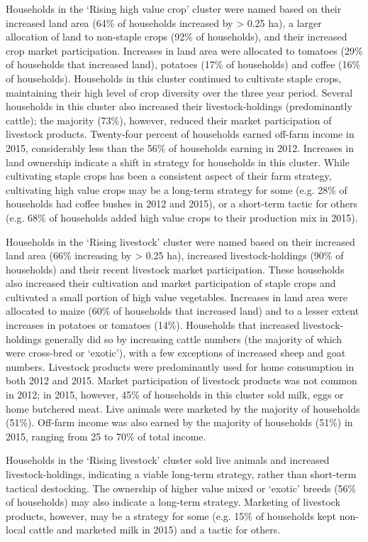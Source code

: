 Households in the `Rising high value crop' cluster were named based on their increased land area (64\% of households increased by {\textgreater} 0.25 ha), a larger allocation of land to non-staple crops (92\% of households), and their increased crop market participation. Increases in land area were allocated to tomatoes (29\% of households that increased land), potatoes (17\% of households) and coffee (16\% of households). Households in this cluster continued to cultivate staple crops, maintaining their high level of crop diversity over the three year period. Several households in this cluster also increased their livestock-holdings (predominantly cattle); the majority (73\%), however, reduced their market participation of livestock products. Twenty-four percent of households earned off-farm income in 2015, considerably less than the 56\% of households earning in 2012. Increases in land ownership indicate a shift in strategy for households in this cluster. While cultivating staple crops has been a consistent aspect of their farm strategy, cultivating high value crops may be a long-term strategy for some (e.g. 28\% of households had coffee bushes in 2012 and 2015), or a short-term tactic for others (e.g. 68\% of households added high value crops to their production mix in 2015).

Households in the `Rising livestock' cluster were named based on their increased land area (66\% increasing by {\textgreater} 0.25 ha), increased livestock-holdings (90\% of households) and their recent livestock market participation. These households also increased their cultivation and market participation of staple crops and cultivated a small portion of high value vegetables. Increases in land area were allocated to maize (60\% of households that increased land) and to a lesser extent increases in potatoes or tomatoes (14\%). Households that increased livestock-holdings generally did so by increasing cattle numbers (the majority of which were cross-bred or `exotic'), with a few exceptions of increased sheep and goat numbers. Livestock products were predominantly used for home consumption in both 2012 and 2015. Market participation of livestock products was not common in 2012; in 2015, however, 45\% of households in this cluster sold milk, eggs or home butchered meat. Live animals were marketed by the majority of households (51\%). Off-farm income was also earned by the majority of households (51\%) in 2015, ranging from 25 to 70\% of total income.

Households in the `Rising livestock' cluster sold live animals and increased livestock-holdings, indicating a viable long-term strategy, rather than short-term tactical destocking. The ownership of higher value mixed or `exotic' breeds (56\% of households) may also indicate a long-term strategy. Marketing of livestock products, however, may be a strategy for some (e.g. 15\% of households kept non-local cattle and marketed milk in 2015) and a tactic for others.

